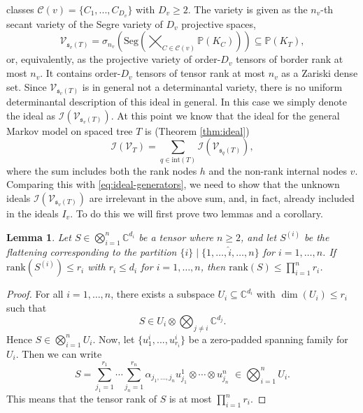 \documentclass[12pt]{article}
\newtheorem{lemma}[theorem]{Lemma}
\theoremstyle{definition}
\numberwithin{theorem}{section}
\newcommand{\PP}{\mathbb{P}}
\newcommand{\CC}{\mathbb{C}}
\newcommand{\rank}{\mathrm{rank}}
\newcommand{\V}{\mathcal{V}}
\begin{document}
classes $\mathcal C(v) = \{C_1, ..., C_{D_v}\}$ with $D_v \geq 2$. The variety is given as the $n_v$-th secant variety of the Segre variety of $D_v$ projective spaces,
\begin{equation} \label{eq:star-tree-secant}
    \V_{\mathfrak{s}_v(T)} = \sigma_{n_v}\left(\mathrm{Seg}\left(\bigtimes_{C \in \mathcal{C}(v)} \PP\left(K_C\right)\right)\right) \subseteq \PP\left( K_T \right),
\end{equation}
or, equivalently, as the projective variety of order-$D_v$ tensors of border rank at most $n_v$. It contains order-$D_v$ tensors of tensor rank at most $n_v$ as a Zariski dense set.  
Since $\V_{\mathfrak{s}_v(T)}$ is in general not a determinantal variety, there is no uniform determinantal description of this ideal in general. In this case we simply denote the ideal as $\mathcal I(\V_{\mathfrak{s}_v(T)})$. 
At this point we know that the ideal for the general Markov model on spaced tree $T$ is (Theorem \ref{thm:ideal})
\begin{equation*}
    \mathcal{I}(\mathcal{V}_T) = \sum_{q \in \mathrm{int}(T)}\mathcal{I}(\V_{\mathfrak{s}_q(T)}),
\end{equation*}
where the sum includes both the rank nodes $h$ and the non-rank internal nodes $v$. 
Comparing this with \eqref{eq:ideal-generators}, we need to show that the unknown ideals $\mathcal I(\V_{\mathfrak{s}_v(T)})$ are irrelevant in the above sum, and, in fact, already included in the ideals $I_v$.
To do this we will first prove two lemmas and a corollary.
\begin{lemma} \label{lem:bound-tensor-rank}
Let $S \in \bigotimes_{i=1}^n \CC^{d_i}$ be a tensor where $n\geq 2$, and let $S^{(i)}$ be the flattening corresponding to the partition $\{i\} \mid \{1, \ldots, \hat{i}, \ldots, n\}$ for $i=1,\ldots, n$. If $\rank(S^{(i)}) \leq r_i$ with $r_i \leq d_i$ for $i=1,\ldots,n$, then $\mathrm{rank}(S) \leq \prod_{i=1}^{n} r_i$.
\end{lemma}
\begin{proof}
For all $i=1, \ldots, n$, there exists a subspace $U_i \subseteq \CC^{d_i}$ with $\dim(U_i) \leq r_i$ such that
\begin{equation*}
    S \in U_i \otimes \bigotimes_{j\neq i} \CC^{d_j}.
\end{equation*}
Hence $S \in \bigotimes_{i=1}^n U_i$. Now, let $\{u^i_1, ..., u^i_{r_i}\}$ be a zero-padded spanning family for $U_i$. Then we can write 
\begin{equation*}
    S = \sum_{j_1=1}^{r_1}\cdots \sum_{j_n=1}^{r_n}\alpha_{j_1,\ldots, j_n} u^1_{j_1} \otimes 
    \cdots \otimes u^{n}_{j_n} \,\, \in \bigotimes_{i = 1}^{n} U_i.
\end{equation*}
This means that the tensor rank of $S$ is at most $\prod_{i=1}^n r_i$.
\end{proof}
\end{document}
